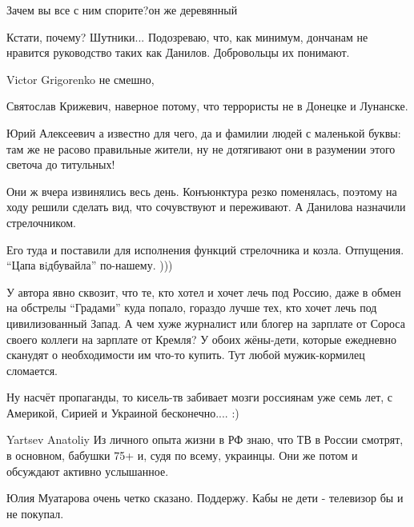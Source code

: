 \begin{itemize}
\begin{itemize}
Зачем вы все с ним спорите?он же деревянный


Кстати, почему? Шутники... Подозреваю, что, как минимум, дончанам не нравится
руководство таких как Данилов. Добровольцы их понимают.


Victor Grigorenko не смешно,


Святослав Крижевич, наверное потому, что террористы не в Донецке и Лунанске.


Юрий Алексеевич а известно для чего, да и фамилии людей с маленькой буквы: там
же не расово правильные жители, ну не дотягивают они в разумении этого светоча
до титульных!

\end{itemize}


Они ж вчера извинялись весь день. Конъюнктура резко поменялась, поэтому на ходу
решили сделать вид, что сочувствуют и переживают. А Данилова назначили
стрелочником.


Его туда и поставили для исполнения функций стрелочника и козла. Отпущения.
\enquote{Цапа вiдбувайла} по-нашему. )))


У автора явно сквозит, что те, кто хотел и хочет лечь под Россию, даже в обмен
на обстрелы \enquote{Градами} куда попало, гораздо лучше тех, кто хочет лечь под
цивилизованный Запад. А чем хуже журналист или блогер на зарплате от Сороса
своего коллеги на зарплате от Кремля? У обоих жёны-дети, которые ежедневно
сканудят о необходимости им что-то купить. Тут любой мужик-кормилец сломается.


Ну насчёт пропаганды, то кисель-тв забивает мозги россиянам уже семь лет, с
Америкой, Сирией и Украиной бесконечно.... :)


Yartsev Anatoliy Из личного опыта жизни в РФ знаю, что ТВ в России смотрят, в
основном, бабушки 75+ и, судя по всему, украинцы. Они же потом и обсуждают
активно услышанное.


Юлия Муатарова очень четко сказано. Поддержу.
Кабы не дети - телевизор бы и не покупал.


\end{itemize}
